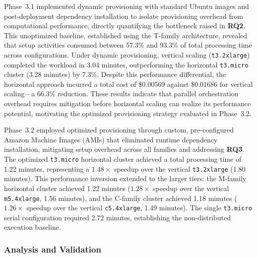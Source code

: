 \documentclass[conference]{IEEEtran}
\begin{document}
Phase~3.1 implemented dynamic provisioning with standard Ubuntu images and
post-deployment dependency installation to isolate provisioning overhead from
computational performance, directly quantifying the bottleneck raised in \textbf{RQ2}. This unoptimized baseline, established using the
T-family architecture, revealed that setup activities consumed between 57.3\%
and 93.3\% of total processing time across configurations. Under dynamic
provisioning, vertical scaling (\texttt{t3.2xlarge}) completed the workload in
3.04 minutes, outperforming the horizontal \texttt{t3.micro} cluster (3.28
minutes) by 7.3\%. Despite this performance differential, the horizontal
approach incurred a total cost of \$0.00569 against \$0.01686 for vertical
scaling---a 66.3\% reduction. These results indicate that parallel
orchestration overhead requires mitigation before horizontal scaling can
realize its performance potential, motivating the optimized provisioning
strategy evaluated in Phase~3.2.

Phase~3.2 employed optimized provisioning through custom, pre-configured
Amazon Machine Images (AMIs) that eliminated runtime dependency installation,
mitigating setup overhead across all families and addressing \textbf{RQ3}. The optimized \texttt{t3.micro}
horizontal cluster achieved a total processing time of 1.22 minutes,
representing a $1.48\times$ speedup over the vertical \texttt{t3.2xlarge}
(1.80 minutes). This performance inversion extended to the larger tiers: the
M-family horizontal cluster achieved 1.22 minutes ($1.28\times$ speedup over
the vertical \texttt{m5.4xlarge}, 1.56 minutes), and the C-family cluster
achieved 1.18 minutes ($1.26\times$ speedup over the vertical
\texttt{c5.4xlarge}, 1.49 minutes). The single \texttt{t3.micro} serial
configuration required 2.72 minutes, establishing the non-distributed execution
baseline.

\subsubsection{Analysis and Validation}
\end{document}
